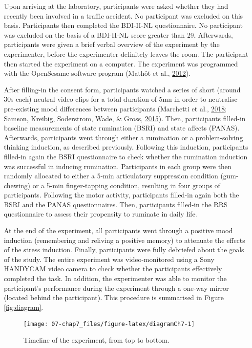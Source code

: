 \documentclass[a4paper,12pt,twoside,openright,oldfontcommands,final]{memoir}
\begin{document}
Upon arriving at the laboratory, participants were asked whether they had recently been involved in a traffic accident. No participant was excluded on this basis. Participants then completed the BDI-II-NL questionnaire. No participant was excluded on the basis of a BDI-II-NL score greater than 29. Afterwards, participants were given a brief verbal overview of the experiment by the experimenter, before the experimenter definitely leaves the room. The participant then started the experiment on a computer. The experiment was programmed with the OpenSesame software program (Mathôt et al., \protect\hyperlink{ref-mathot_opensesame_2012}{2012}).

After filling-in the consent form, participants watched a series of short (around 30s each) neutral video clips for a total duration of 5mn in order to neutralise pre-existing mood differences between participants (Marchetti et al., \protect\hyperlink{ref-marchetti_brief_2018}{2018}; Samson, Kreibig, Soderstrom, Wade, \& Gross, \protect\hyperlink{ref-samson_eliciting_2015}{2015}). Then, participants filled-in baseline measurements of state rumination (BSRI) and state affects (PANAS). Afterwards, participants went through either a rumination or a problem-solving thinking induction, as described previously. Following this induction, participants filled-in again the BSRI questionnaire to check whether the rumination induction was successful in inducing rumination. Participants in each group were then randomly allocated to either a 5-min articulatory suppression condition (gum-chewing) or a 5-min finger-tapping condition, resulting in four groups of participants. Following the motor activity, participants filled-in again both the BSRI and the PANAS questionnaires. Then, participants filled-in the RRS questionnaire to assess their propensity to ruminate in daily life.

At the end of the experiment, all participants went through a positive mood induction (remembering and reliving a positive memory) to attenuate the effects of the stress induction. Finally, participants were fully debriefed about the goals of the study. The entire experiment was video-monitored using a Sony HANDYCAM video camera to check whether the participants effectively completed the task. In addition, the experimenter was able to monitor the participant's performance during the experiment through a one-way mirror (located behind the participant). This procedure is summarised in Figure \ref{fig:diagram}.

\begin{figure}[H]

{\centering \texttt{[image: 07-chap7\_files/figure-latex/diagramCh7-1]} 

}

\caption{Timeline of the experiment, from top to bottom.}\label{fig:diagramCh7}
\end{figure}
\end{document}
